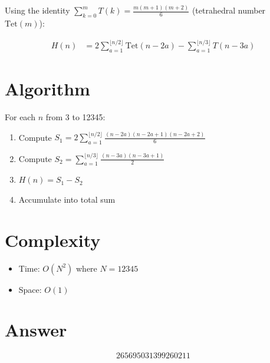 \documentclass[12pt]{article}
\begin{document}
Using the identity $\sum_{k=0}^{m} T(k) = \frac{m(m+1)(m+2)}{6}$ (tetrahedral number $\text{Tet}(m)$):

\begin{align}
H(n) &= 2\sum_{a=1}^{\lfloor n/2 \rfloor} \text{Tet}(n-2a) - \sum_{a=1}^{\lfloor n/3 \rfloor} T(n-3a)
\end{align}

\section{Algorithm}
For each $n$ from 3 to 12345:
\begin{enumerate}
    \item Compute $S_1 = 2\sum_{a=1}^{\lfloor n/2 \rfloor} \frac{(n-2a)(n-2a+1)(n-2a+2)}{6}$
    \item Compute $S_2 = \sum_{a=1}^{\lfloor n/3 \rfloor} \frac{(n-3a)(n-3a+1)}{2}$
    \item $H(n) = S_1 - S_2$
    \item Accumulate into total sum
\end{enumerate}

\section{Complexity}
\begin{itemize}
    \item Time: $O(N^2)$ where $N = 12345$
    \item Space: $O(1)$
\end{itemize}

\section{Answer}

\[
\boxed{265695031399260211}
\]
\end{document}
